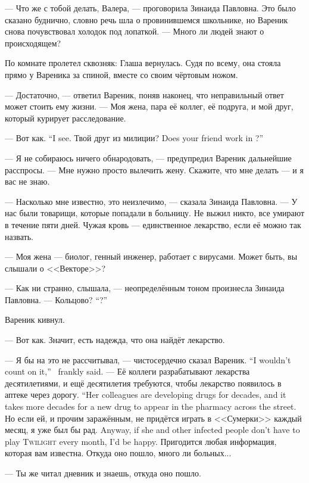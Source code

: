 --- Что же с тобой делать, Валера, --- проговорила Зинаида Павловна.
Это было сказано буднично, словно речь шла о провинившемся школьнике, но Вареник снова почувствовал холодок под лопаткой.
--- Много ли людей знают о происходящем?

По комнате пролетел сквозняк: Глаша вернулась.
Судя по всему, она стояла прямо у Вареника за спиной, вместе со своим чёртовым ножом.

--- Достаточно, --- ответил Вареник, поняв наконец, что неправильный ответ может стоить ему жизни.
--- Моя жена, пара её коллег, её подруга, и мой друг, который курирует расследование.

{--- Вот как.}
{``I see.}
{Твой друг из милиции?}
{Does your friend work in \militsiya?''}

--- Я не собираюсь ничего обнародовать, --- предупредил Вареник дальнейшие расспросы.
--- Мне нужно просто вылечить жену.
Скажите, что мне делать --- и я вас не знаю.

--- Насколько мне известно, это неизлечимо, --- сказала Зинаида Павловна.
--- У нас были товарищи, которые попадали в больницу.
Не выжил никто, все умирают в течение пяти дней.
Чужая кровь --- единственное лекарство, если её можно так назвать.

--- Моя жена --- биолог, генный инженер, работает с вирусами.
Может быть, вы слышали о <<Векторе>>?

--- Как ни странно, слышала, --- неопределённым тоном произнесла Зинаида Павловна.
{--- Кольцово?}
{``\Koltsovo?''}

Вареник кивнул.

--- Вот как.
Значит, есть надежда, что она найдёт лекарство.

{--- Я бы на это не рассчитывал, --- чистосердечно сказал Вареник.}
{``I wouldn't count on it,'' \Varenik\ frankly said.}
{--- Её коллеги разрабатывают лекарства десятилетиями, и ещё десятилетия требуются, чтобы лекарство появилось в аптеке через дорогу.}
{``Her colleagues are developing drugs for decades, and it takes more decades for a new drug to appear in the pharmacy across the street.}
{Но если ей, и прочим заражённым, не придётся играть в <<Сумерки>> каждый месяц, я уже был бы рад.}
{Anyway, if she and other infected people don't have to play \textsc{Twilight} every month, I'd be happy.}
Пригодится любая информация, которая вам известна.
Откуда оно пошло, много ли больных...

--- Ты же читал дневник и знаешь, откуда оно пошло.

